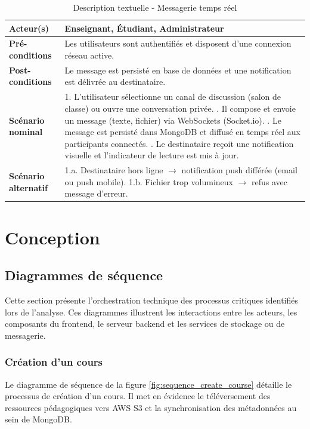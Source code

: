 \begin{table}[H]
\centering
\small
\begin{tabularx}{\textwidth}{|l|X|}
\hline
\rowcolor[HTML]{EFEFEF} 
\textbf{Acteur(s)} & Enseignant, Étudiant, Administrateur \\ \hline
\textbf{Pré-conditions} & Les utilisateurs sont authentifiés et disposent d'une connexion réseau active. \\ \hline
\textbf{Post-conditions} & Le message est persisté en base de données et une notification est délivrée au destinataire. \\ \hline
\textbf{Scénario nominal} & 
1. L'utilisateur sélectionne un canal de discussion (salon de classe) ou ouvre une conversation privée. \newline
2. Il compose et envoie un message (texte, fichier) via WebSockets (Socket.io). \newline
3. Le message est persisté dans MongoDB et diffusé en temps réel aux participants connectés. \newline
4. Le destinataire reçoit une notification visuelle et l'indicateur de lecture est mis à jour. \\ \hline
\textbf{Scénario alternatif} & 
1.a. Destinataire hors ligne $\rightarrow$ notification push différée (email ou push mobile). \newline
1.b. Fichier trop volumineux $\rightarrow$ refus avec message d'erreur. \\ \hline
\end{tabularx}
\caption{Description textuelle - Messagerie temps réel}
\end{table}

\section{Conception}

\subsection{Diagrammes de séquence}
Cette section présente l'orchestration technique des processus critiques identifiés lors de l'analyse. Ces diagrammes illustrent les interactions entre les acteurs, les composants du frontend, le serveur backend et les services de stockage ou de messagerie.

\subsubsection{Création d'un cours}
Le diagramme de séquence de la figure \ref{fig:sequence_create_course} détaille le processus de création d'un cours. Il met en évidence le téléversement des ressources pédagogiques vers AWS S3 et la synchronisation des métadonnées au sein de MongoDB.

